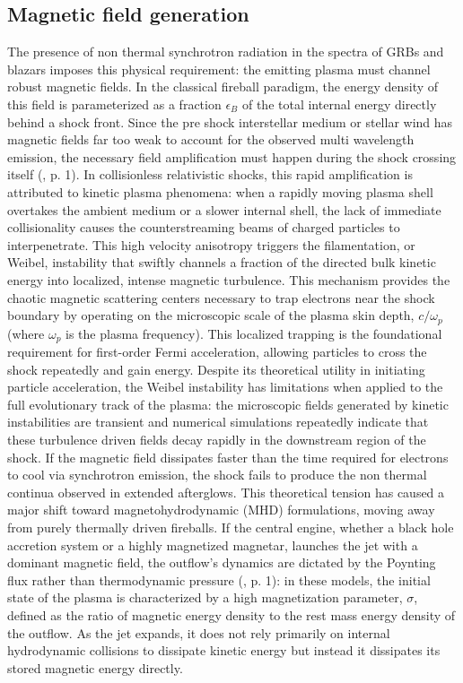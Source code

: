 \documentclass{aa} %
\begin{document}
\subsection{Magnetic field generation}
The presence of non thermal synchrotron radiation in the spectra of GRBs and blazars imposes this physical requirement: the emitting plasma must channel robust magnetic fields. In the classical fireball paradigm, the energy density of this field is parameterized as a fraction $\epsilon_B$ of the total internal energy directly behind a shock front. Since the pre shock interstellar medium or stellar wind has magnetic fields far too weak to account for the observed multi wavelength emission, the necessary field amplification must happen during the shock crossing itself (\citet{Peer2019}, p. 1).
In collisionless relativistic shocks, this rapid amplification is attributed to kinetic plasma phenomena: when a rapidly moving plasma shell overtakes the ambient medium or a slower internal shell, the lack of immediate collisionality causes the counterstreaming beams of charged particles to interpenetrate. This high velocity anisotropy triggers the filamentation, or Weibel, instability \citep{Brainerd1999} that swiftly channels a fraction of the directed bulk kinetic energy into localized, intense magnetic turbulence. This mechanism provides the chaotic magnetic scattering centers necessary to trap electrons near the shock boundary by operating on the microscopic scale of the plasma skin depth, $c/\omega_p$ (where $\omega_p$ is the plasma frequency). This localized trapping is the foundational requirement for first-order Fermi acceleration, allowing particles to cross the shock repeatedly and gain energy.
Despite its theoretical utility in initiating particle acceleration, the Weibel instability has limitations when applied to the full evolutionary track of the plasma: the microscopic fields generated by kinetic instabilities are transient and numerical simulations repeatedly indicate that these turbulence driven fields decay rapidly in the downstream region of the shock. If the magnetic field dissipates faster than the time required for electrons to cool via synchrotron emission, the shock fails to produce the non thermal continua observed in extended afterglows.
This theoretical tension has caused a major shift toward magnetohydrodynamic (MHD) formulations, moving away from purely thermally driven fireballs. If the central engine, whether a black hole accretion system or a highly magnetized magnetar, launches the jet with a dominant magnetic field, the outflow's dynamics are dictated by the Poynting flux rather than thermodynamic pressure (\citet{KumarandZhang2015}, p. 1): in these models, the initial state of the plasma is characterized by a high magnetization parameter, $\sigma$, defined as the ratio of magnetic energy density to the rest mass energy density of the outflow. As the jet expands, it does not rely primarily on internal hydrodynamic collisions to dissipate kinetic energy but instead it dissipates its stored magnetic energy directly.
\end{document}
